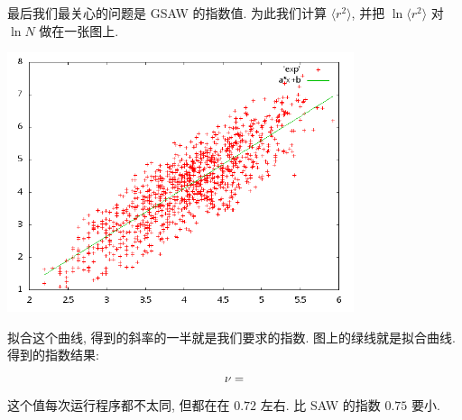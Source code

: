 \documentclass{ctexart}
\begin{document}
最后我们最关心的问题是 GSAW 的指数值. 为此我们计算 $\langle r^2\rangle$,
并把 $\ln\langle r^2\rangle$ 对 $\ln N$ 做在一张图上.
\begin{center}
\includegraphics[width=4in]{exp.png}
\end{center}
拟合这个曲线, 得到的斜率的一半就是我们要求的指数. 图上的绿线就是拟合曲线.
得到的指数结果:
\[
\nu=\relax
\]
这个值每次运行程序都不太同, 但都在在 $0.72$ 左右. 比 SAW 的指数 $0.75$ 要小. 
\end{document}
